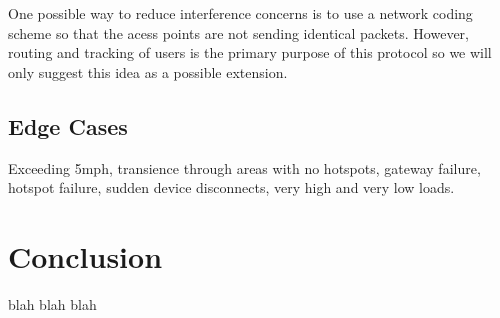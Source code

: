 \documentclass[letterpaper,12pt]{article}
\begin{document}
One possible way to reduce interference concerns is to use a network coding 
scheme so that the acess points are not sending identical packets. However,
routing and tracking of users is the primary purpose of this protocol so 
we will only suggest this idea as a possible extension.

\subsection{Edge Cases}
Exceeding 5mph, transience through areas with no hotspots, gateway failure, 
hotspot failure, sudden device disconnects, very high and very low loads.

\section{Conclusion}
blah blah blah

{\footnotesize 
}
\end{document}
